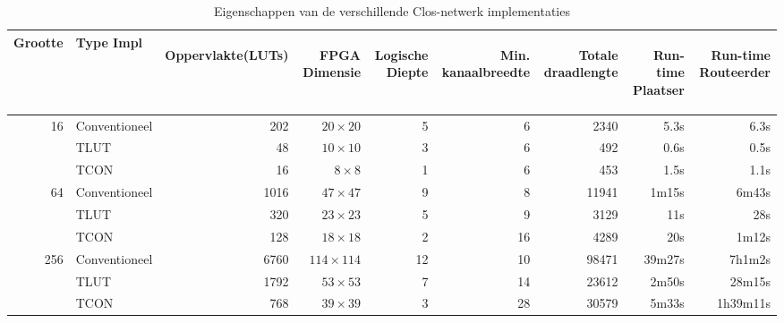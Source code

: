 \documentclass[a4paper,oneside,12pt]{article}
\begin{document}
\renewcommand{\arraystretch}{1.2} 
\renewcommand{\tabcolsep}{0.20cm} 
\begin{table}[t]
\caption{Eigenschappen van de verschillende Clos-netwerk implementaties}
\label{tbl:clos}
\centering
\begin{tabular}{rlrrrrrrr}
\textbf{Grootte}&\textbf{Type Impl}&\begin{sideways}Oppervlakte(LUTs)\end{sideways}&\begin{sideways}FPGA Dimensie\end{sideways}&\begin{sideways}Logische Diepte\end{sideways}&\begin{sideways}Min. kanaalbreedte\end{sideways}&\begin{sideways}Totale draadlengte\end{sideways}&\begin{sideways}Run-time Plaatser\end{sideways}&\begin{sideways}Run-time Routeerder\end{sideways}\\
\hline
\hline
\multirow{3}{*}{16} 	&Conventioneel	&202	&$20\times 20$	&5	&6	&2340		&5.3s	&6.3s\\
					&TLUT	&48		&$10\times 10$		&3	&6	&492		&0.6s	&0.5s\\
					&TCON	&16		&$8\times 8$		&1	&6	&453		&1.5s	&1.1s\\
\hline
\multirow{3}{*}{64} 	&Conventioneel	&1016	&$47\times 47$	&9	&8	&11941		&1m15s		&6m43s\\
					&TLUT	&320	&$23\times 23$	&5	&9	&3129		&11s		&28s\\
					&TCON	&128	&$18\times 18$	&2	&16	&4289		&20s		&1m12s\\
\hline
\multirow{3}{*}{256} 	&Conventioneel	&6760	&$114\times 114$	&12	&10	&98471		&39m27s	&7h1m2s\\
					&TLUT	&1792 	&$53\times 53$		&7	&14	&23612		&2m50s		&28m15s\\
					&TCON	&768 	&$39\times 39$		&3	&28	&30579		&5m33s		&1h39m11s\\
\hline
\end{tabular}
\end{table}
\end{document}
